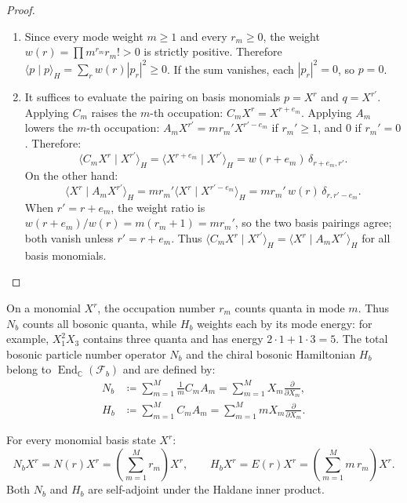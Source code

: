 \begin{proof}
\begin{enumerate}
    \item Since every mode weight $m \ge 1$ and every $r_m \ge 0$, the weight $w(r) = \prod m^{r_m} r_m! > 0$ is strictly positive. Therefore $\langle p \mid p \rangle_H = \sum_r w(r) |p_r|^2 \ge 0$. If the sum vanishes, each $|p_r|^2 = 0$, so $p = 0$.
    \item It suffices to evaluate the pairing on basis monomials $p = X^r$ and $q = X^{r'}$.
    Applying $C_m$ raises the $m$-th occupation: $C_m X^r = X^{r + e_m}$.
    Applying $A_m$ lowers the $m$-th occupation: $A_m X^{r'} = m r_m' X^{r' - e_m}$ if $r_m' \ge 1$, and $0$ if $r_m' = 0$.
    Therefore:
    \begin{equation}
    \langle C_m X^r \mid X^{r'} \rangle_H = \langle X^{r + e_m} \mid X^{r'} \rangle_H = w(r + e_m)\, \delta_{r + e_m, r'}.
    \end{equation}
    On the other hand:
    \begin{equation}
    \langle X^r \mid A_m X^{r'} \rangle_H = m r_m' \langle X^r \mid X^{r' - e_m} \rangle_H = m r_m'\, w(r)\, \delta_{r, r' - e_m}.
    \end{equation}
    When $r'=r+e_m$, the weight ratio is $w(r+e_m)/w(r)=m(r_m+1)=m r_m'$, so the two basis pairings agree; both vanish unless $r'=r+e_m$.
    Thus $\langle C_m X^r \mid X^{r'} \rangle_H = \langle X^r \mid A_m X^{r'} \rangle_H$ for all basis monomials.
\end{enumerate}
\end{proof}

\begin{definition}
On a monomial $X^r$, the occupation number $r_m$ counts quanta in mode $m$. Thus $N_b$ counts all bosonic quanta, while $H_b$ weights each by its mode energy: for example, $X_1^2X_3$ contains three quanta and has energy $2\cdot1+1\cdot3=5$.
The total bosonic particle number operator $N_b$ and the chiral bosonic Hamiltonian $H_b$ belong to $\operatorname{End}_{\mathbb C}(\mathcal F_b)$ and are defined by:
\begin{align}
N_b &\coloneqq \sum_{m=1}^M \frac{1}{m} C_m A_m = \sum_{m=1}^M X_m \frac{\partial}{\partial X_m}, \\
H_b &\coloneqq \sum_{m=1}^M C_m A_m = \sum_{m=1}^M m X_m \frac{\partial}{\partial X_m}.
\end{align}
\end{definition}

\begin{lemma}
For every monomial basis state $X^r$:
\begin{equation}
N_b X^r = N(r) X^r = \left(\sum_{m=1}^M r_m\right) X^r, \qquad H_b X^r = E(r) X^r = \left(\sum_{m=1}^M m\, r_m\right) X^r.
\end{equation}
Both $N_b$ and $H_b$ are self-adjoint under the Haldane inner product.
\end{lemma}

